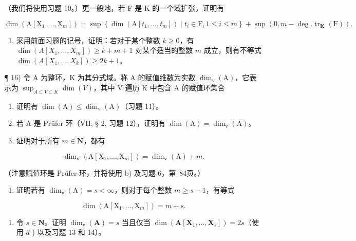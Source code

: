 （我们将使用习题 10。）更一般地，若 F 是 K 的一个域扩张，证明有

\[
\dim \left(\mathrm{A} \left[ \mathrm{X} _ {1}, \dots , \mathrm{X} _ {m} \right]\right) = \sup \left\{\dim (\mathrm{A} \left[ t _ {1}, \dots , t _ {m} \right]) \mid t _ {i} \in \mathrm{F}, 1 \leqslant i \leqslant m \right\} + \sup (0, m - \deg . \operatorname{tr} _ {\mathbf {K}} (\mathrm{F})).
\]

\begin{enumerate}
\def\labelenumi{\arabic{enumi})}
\setcounter{enumi}{14}
\tightlist
\item
  采用前面习题的记号，证明：若对于某个整数 \(k \geqslant 0\)，有 \(\dim(A[X_1, ..., X_m]) \geqslant k + m + 1\) 对某个适当的整数 \(m\) 成立，则有不等式 \(\dim(A[X_1, ..., X_k]) \geqslant 2k + 1\)。
\end{enumerate}

  ¶ 16) 令 A 为整环，K 为其分式域。称 A 的赋值维数为实数 \(\dim_{\mathrm v}(\mathrm A)\)，它表示为 \(\sup_{A \subset V \subset K} \dim(V)\)，其中 V 遍历 K 中包含 A 的赋值环集合

\begin{enumerate}
\def\labelenumi{\alph{enumi})}
\item
  证明有 \(\dim(\mathrm A) \leqslant \dim_{\mathrm v}(\mathrm A)\)（习题 11）。
\item
  若 A 是 Prüfer 环（VII, § 2, 习题 12），证明有 \(\dim(\mathrm A) = \dim_{\mathrm v}(\mathrm A)\)。
\item
  证明对于所有 \(m \in \mathbf{N}\)，都有
\end{enumerate}

\[
\dim_ {\mathbf {v}} (\mathrm{A} [ \mathrm{X} _ {1},..., \mathrm{X} _ {m} ]) = \dim_ {\mathbf {v}} (\mathrm{A}) + m.
\]

（注意赋值环是 Prüfer 环，并将使用 b) 及习题 6，第~84页。）

\begin{enumerate}
\def\labelenumi{\alph{enumi})}
\setcounter{enumi}{3}
\tightlist
\item
  证明若有 \(\dim_{\mathrm v}(\mathrm A) = s < \infty\)，则对于每个整数 \(m \geqslant s - 1\)，有等式
\end{enumerate}

\[
\dim (\mathrm{A} [ \mathrm{X} _ {1},..., \mathrm{X} _ {m} ]) = m + s.
\]

\begin{enumerate}
\def\labelenumi{\alph{enumi})}
\setcounter{enumi}{4}
\tightlist
\item
  令 \(s \in \mathbf{N}\)。证明 \(\dim_{\mathrm{v}}(\mathbf{A}) = s\) 当且仅当 \(\dim(\mathbf{A}[\mathbf{X}_1, ..., \mathbf{X}_s]) = 2s\)（使用 \(d\) ) 以及习题 13 和 14）。
\end{enumerate}

